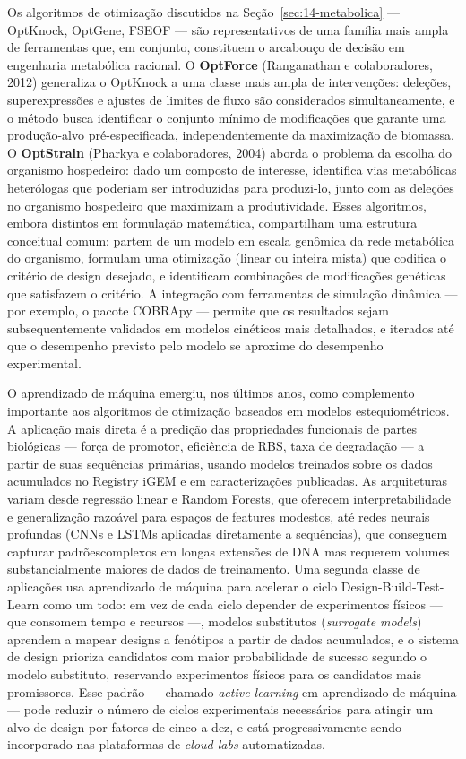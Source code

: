 Os algoritmos de otimização discutidos na Seção~\ref{sec:14-metabolica} --- OptKnock, OptGene, FSEOF --- são representativos de uma família mais ampla de ferramentas que, em conjunto, constituem o arcabouço de decisão em engenharia metabólica racional. O \textbf{OptForce} (Ranganathan e colaboradores, 2012) generaliza o OptKnock a uma classe mais ampla de intervenções: deleções, superexpressões e ajustes de limites de fluxo são considerados simultaneamente, e o método busca identificar o conjunto mínimo de modificações que garante uma produção-alvo pré-especificada, independentemente da maximização de biomassa. O \textbf{OptStrain} (Pharkya e colaboradores, 2004) aborda o problema da escolha do organismo hospedeiro: dado um composto de interesse, identifica vias metabólicas heterólogas que poderiam ser introduzidas para produzi-lo, junto com as deleções no organismo hospedeiro que maximizam a produtividade. Esses algoritmos, embora distintos em formulação matemática, compartilham uma estrutura conceitual comum: partem de um modelo em escala genômica da rede metabólica do organismo, formulam uma otimização (linear ou inteira mista) que codifica o critério de design desejado, e identificam combinações de modificações genéticas que satisfazem o critério. A integração com ferramentas de simulação dinâmica --- por exemplo, o pacote COBRApy --- permite que os resultados sejam subsequentemente validados em modelos cinéticos mais detalhados, e iterados até que o desempenho previsto pelo modelo se aproxime do desempenho experimental.

O aprendizado de máquina emergiu, nos últimos anos, como complemento importante aos algoritmos de otimização baseados em modelos estequiométricos. A aplicação mais direta é a predição das propriedades funcionais de partes biológicas --- força de promotor, eficiência de RBS, taxa de degradação --- a partir de suas sequências primárias, usando modelos treinados sobre os dados acumulados no Registry iGEM e em caracterizações publicadas. As arquiteturas variam desde regressão linear e Random Forests, que oferecem interpretabilidade e generalização razoável para espaços de features modestos, até redes neurais profundas (CNNs e LSTMs aplicadas diretamente a sequências), que conseguem capturar padrõescomplexos em longas extensões de DNA mas requerem volumes substancialmente maiores de dados de treinamento. Uma segunda classe de aplicações usa aprendizado de máquina para acelerar o ciclo Design-Build-Test-Learn como um todo: em vez de cada ciclo depender de experimentos físicos --- que consomem tempo e recursos ---, modelos substitutos (\emph{surrogate models}) aprendem a mapear designs a fenótipos a partir de dados acumulados, e o sistema de design prioriza candidatos com maior probabilidade de sucesso segundo o modelo substituto, reservando experimentos físicos para os candidatos mais promissores. Esse padrão --- chamado \emph{active learning} em aprendizado de máquina --- pode reduzir o número de ciclos experimentais necessários para atingir um alvo de design por fatores de cinco a dez, e está progressivamente sendo incorporado nas plataformas de \emph{cloud labs} automatizadas.


